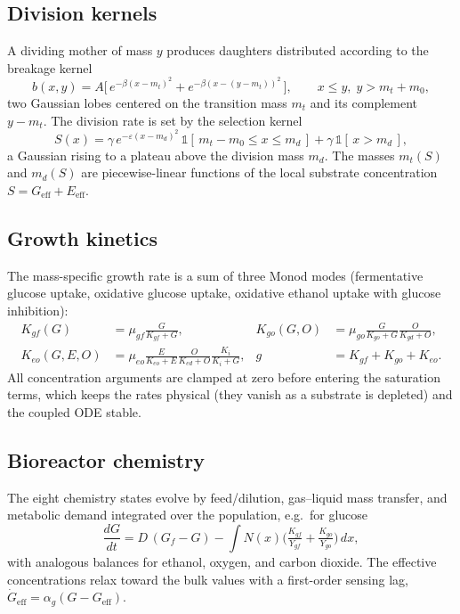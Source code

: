 \documentclass[11pt,a4paper]{article}
\begin{document}
\subsection{Division kernels}
A dividing mother of mass $y$ produces daughters distributed according to the breakage kernel
\begin{equation}
b(x,y) = A\Big[\,e^{-\beta (x - m_t)^2} + e^{-\beta (x - (y - m_t))^2}\,\Big],
\qquad x \le y,\; y > m_t + m_0,
\end{equation}
two Gaussian lobes centered on the transition mass $m_t$ and its complement $y - m_t$. The division
rate is set by the selection kernel
\begin{equation}
S(x) = \gamma\, e^{-\varepsilon (x - m_d)^2}\,\mathbb{1}[\,m_t - m_0 \le x \le m_d\,]
      + \gamma\,\mathbb{1}[\,x > m_d\,],
\end{equation}
a Gaussian rising to a plateau above the division mass $m_d$. The masses $m_t(S)$ and $m_d(S)$ are
piecewise-linear functions of the local substrate concentration $S = G_{\mathrm{eff}} + E_{\mathrm{eff}}$.

\subsection{Growth kinetics}
The mass-specific growth rate is a sum of three Monod modes (fermentative glucose uptake, oxidative
glucose uptake, oxidative ethanol uptake with glucose inhibition):
\begin{align}
K_{gf}(G) &= \mu_{gf}\frac{G}{K_{gf}+G}, &
K_{go}(G,O) &= \mu_{go}\frac{G}{K_{go}+G}\frac{O}{K_{gd}+O}, \\
K_{eo}(G,E,O) &= \mu_{eo}\frac{E}{K_{eo}+E}\frac{O}{K_{ed}+O}\frac{K_i}{K_i+G}, &
g &= K_{gf} + K_{go} + K_{eo}.
\end{align}
All concentration arguments are clamped at zero before entering the saturation terms, which keeps the
rates physical (they vanish as a substrate is depleted) and the coupled ODE stable.

\subsection{Bioreactor chemistry}
The eight chemistry states evolve by feed/dilution, gas--liquid mass transfer, and metabolic demand
integrated over the population, e.g.\ for glucose
\begin{equation}
\frac{dG}{dt} = D\,(G_f - G) - \int N(x)\Big(\tfrac{K_{gf}}{Y_{gf}} + \tfrac{K_{go}}{Y_{go}}\Big)\,dx,
\end{equation}
with analogous balances for ethanol, oxygen, and carbon dioxide. The effective concentrations relax
toward the bulk values with a first-order sensing lag, $\dot G_{\mathrm{eff}} = \alpha_g (G - G_{\mathrm{eff}})$.
\end{document}
